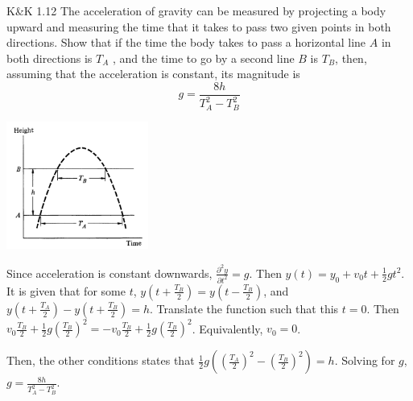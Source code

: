 \documentclass{esg8012pset}
\begin{document}
\begin{problem}{K\&K 1.12}
  The acceleration of gravity can be measured by projecting a body upward and measuring the
  time that it takes to pass two given points in both directions. Show that if the time the body takes
  to pass a horizontal line $A$ in both directions is $T_A$ , and the time to go by a second line $B$ is $T_B$,
  then, assuming that the acceleration is constant, its magnitude is
  $$g = \frac{8h}{T_A^2 - T_B^2}$$
  \begin{center}\includegraphics[width=0.35\textwidth]{ps01_1}\end{center}
\end{problem}
\begin{solution}
  Since acceleration is constant downwards, $\frac{\partial^2 y}{\partial t^2} = g$.  Then $y(t) = y_0 + v_0 t + \frac{1}{2} g t^2$.  It is given that for some $t$, $y\left(t + \frac{T_B}{2}\right) = y\left(t - \frac{T_B}{2}\right)$, and $y\left(t + \frac{T_A}{2}\right) - y\left(t + \frac{T_B}{2}\right) = h$.  Translate the function such that this $t = 0$.  Then $v_0 \frac{T_B}{2} + \frac{1}{2} g \left(\frac{T_B}{2}\right)^2 = -v_0 \frac{T_B}{2} + \frac{1}{2} g \left(\frac{T_B}{2}\right)^2$.  Equivalently, $v_0 = 0$.

  Then, the other conditions states that $\frac{1}{2} g\left(\left(\frac{T_A}{2}\right)^2 - \left(\frac{T_B}{2}\right)^2\right) = h$.  Solving for $g$, $g = \frac{8h}{T_A^2 - T_B^2}$.
\end{solution}
\end{document}
